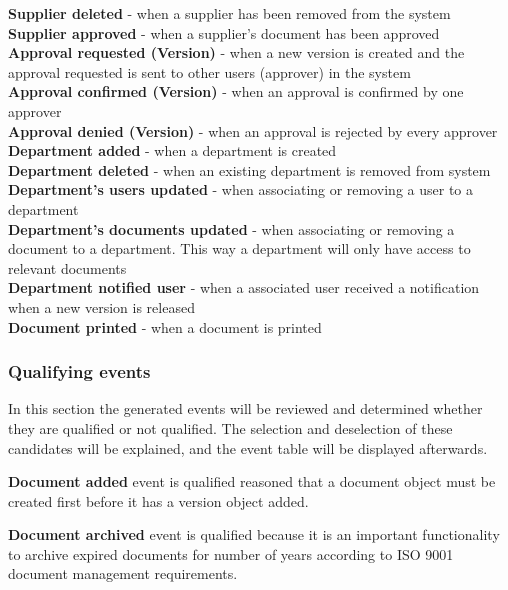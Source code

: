 \textbf{Supplier deleted} - when a supplier has been removed from the system\\
\textbf{Supplier approved} - when a supplier's document has been approved\\
\textbf{Approval requested (Version)} - when a new version is created and the approval requested is sent to other users (approver) in the system\\
\textbf{Approval confirmed (Version)} - when an approval is confirmed by one approver\\
\textbf{Approval denied (Version)} - when an approval is rejected by every approver\\
\textbf{Department added} - when a department is created\\
\textbf{Department deleted} - when an existing department is removed from system\\
\textbf{Department's users updated} - when associating or removing a user to a department\\
\textbf{Department's documents updated} - when associating or removing a document to a department. This way a department will only have access to relevant documents\\
\textbf{Department notified user} - when a associated user received a notification when a new version is released\\ 
\textbf{Document printed} - when a document is printed\\


\subsubsection{Qualifying events}
In this section the generated events will be reviewed and determined whether they are qualified or not qualified.
The selection and deselection of these candidates will be explained, and the event table will be displayed afterwards.

\textbf{Document added} event is qualified reasoned that a document object must be created first before it has a version object added. 

\textbf{Document archived} event is qualified because it is an important functionality to archive expired documents for number of years according to ISO 9001 document management requirements. 

